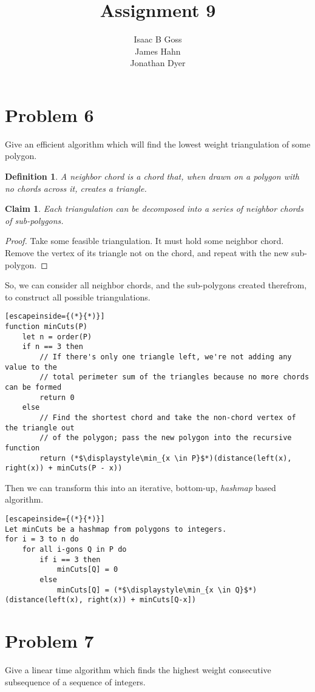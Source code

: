 \documentclass{article}
\author{Isaac B Goss\\ James Hahn\\ Jonathan Dyer}
\title{Assignment 9}
\newtheorem{thm}{Claim}
\newtheorem{defn}{Definition}
\providecommand{\prob}[1]{\section*{Problem #1}}
\begin{document}
\maketitle

    \prob{6}
    Give an efficient algorithm which will find the lowest weight triangulation of some polygon.
    \begin{defn}
        A neighbor chord is a chord that, when drawn on a polygon with no chords across it, creates a triangle.
    \end{defn}

    \begin{thm}
        Each triangulation can be decomposed into a series of neighbor chords of sub-polygons.
    \end{thm}
    \begin{proof}
        Take some feasible triangulation.
        It must hold some neighbor chord.
        Remove the vertex of its triangle not on the chord, and repeat with the new sub-polygon. 
    \end{proof}
    
    So, we can consider all neighbor chords, and the sub-polygons created therefrom, to construct all possible triangulations.
    
    \begin{lstlisting}[escapeinside={(*}{*)}]
function minCuts(P)
    let n = order(P)
    if n == 3 then
    	// If there's only one triangle left, we're not adding any value to the
    	// total perimeter sum of the triangles because no more chords can be formed
        return 0
    else
    	// Find the shortest chord and take the non-chord vertex of the triangle out 
    	// of the polygon; pass the new polygon into the recursive function
        return (*$\displaystyle\min_{x \in P}$*)(distance(left(x), right(x)) + minCuts(P - x)) 
    \end{lstlisting}
    
    Then we can transform this into an iterative, bottom-up, \emph{hashmap} based algorithm.
    
    \begin{lstlisting}[escapeinside={(*}{*)}]
Let minCuts be a hashmap from polygons to integers.
for i = 3 to n do
    for all i-gons Q in P do
        if i == 3 then
            minCuts[Q] = 0
        else
            minCuts[Q] = (*$\displaystyle\min_{x \in Q}$*)(distance(left(x), right(x)) + minCuts[Q-x])
    \end{lstlisting}
    
    \pagebreak
    \prob{7}
    Give a linear time algorithm which finds the highest weight consecutive subsequence of a sequence of integers.
    
\end{document}
